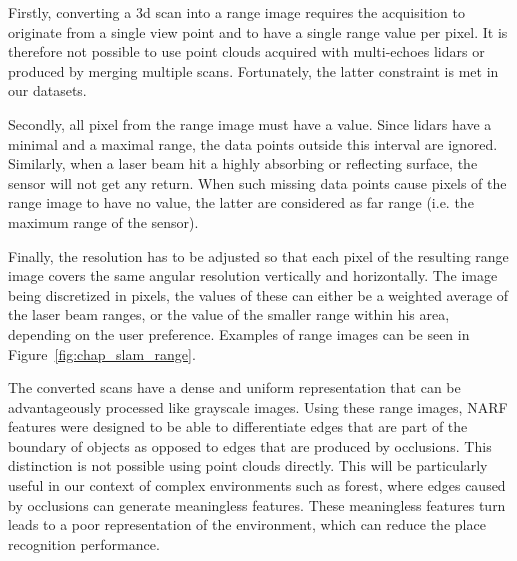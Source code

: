 Firstly, converting a \gls*{3d} scan into a range image requires the acquisition to originate from a single view point and to have a single range value per pixel. It is therefore not possible to use point clouds acquired with multi-echoes \gls*{lidar}s or produced by merging multiple scans. Fortunately, the latter constraint is met in our datasets.

Secondly, all pixel from the range image must have a value. Since \gls*{lidar}s have a minimal and a maximal range, the data points outside this interval are ignored. Similarly, when a laser beam hit a highly absorbing or reflecting surface, the sensor will not get any return. When such missing data points cause pixels of the range image to have no value, the latter are considered as far range (i.e. the maximum range of the sensor). 

Finally, the resolution has to be adjusted so that each pixel of the resulting range image covers the same angular resolution vertically and horizontally. The image being discretized in pixels, the values of these can either be a weighted average of the laser beam ranges, or the value of the smaller range within his area, depending on the user preference. Examples of range images can be seen in Figure~\ref{fig:chap_slam_range}.

The converted scans have a dense and uniform representation that can be advantageously processed like grayscale images. Using these range images, NARF features were designed to be able to differentiate edges that are part of the boundary of objects as opposed to edges that are produced by occlusions. This distinction is not possible using point clouds directly. This will be particularly useful in our context of complex environments such as forest, where edges caused by occlusions can generate meaningless features. These meaningless features turn leads to a poor representation of the environment, which can reduce the place recognition performance. 


